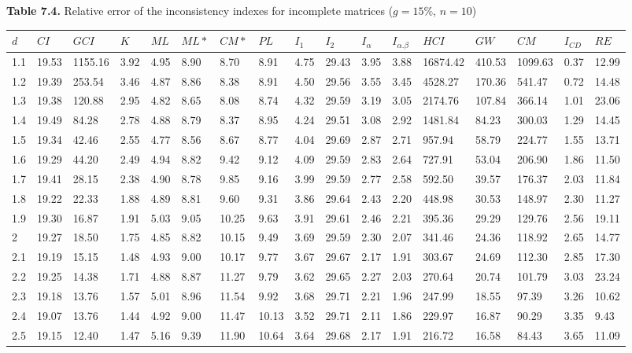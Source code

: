 \newpage
\textbf{Table 7.4.} Relative error of the inconsistency indexes for incomplete matrices ($g=15\%$, $n=10$)
\begin{adjustbox}{angle=90}
  \begin{center}
    \begin{tabular}{|l|llllllllllllllll|}
      \hline $d$ &
$CI$&$	\textit{GCI}$&$K$&$ML$&$ML*$&$CM*$&$PL$&$I_1$&$I_2$&$I_{\alpha}$&$I_{\alpha.\beta}$&$HCI$&$GW$&$CM$&$I_{CD}$&$RE$\\ \hline \hline
1.1&19.53&1155.16&3.92&4.95&8.90&8.70&8.91&4.75&29.43&3.95&3.88&16874.42&410.53&1099.63&0.37&12.99  \\ 
1.2&19.39&253.54&3.46&4.87&8.86&8.38&8.91&4.50&29.56&3.55&3.45&4528.27&170.36&541.47&0.72&14.48  \\ 
1.3&19.38&120.88&2.95&4.82&8.65&8.08&8.74&4.32&29.59&3.19&3.05&2174.76&107.84&366.14&1.01&23.06  \\ 
1.4&19.49&84.28&2.78&4.88&8.79&8.37&8.95&4.24&29.51&3.08&2.92&1481.84&84.23&300.03&1.29&14.45  \\ 
1.5&19.34&42.46&2.55&4.77&8.56&8.67&8.77&4.04&29.69&2.87&2.71&957.94&58.79&224.77&1.55&13.71  \\ 
1.6&19.29&44.20&2.49&4.94&8.82&9.42&9.12&4.09&29.59&2.83&2.64&727.91&53.04&206.90&1.86&11.50  \\ 
1.7&19.41&28.15&2.38&4.90&8.78&9.85&9.16&3.99&29.59&2.77&2.58&592.50&39.57&176.37&2.03&11.84  \\ 
1.8&19.22&22.33&1.88&4.89&8.81&9.60&9.31&3.86&29.64&2.43&2.20&448.98&30.53&148.97&2.30&11.27  \\ 
1.9&19.30&16.87&1.91&5.03&9.05&10.25&9.63&3.91&29.61&2.46&2.21&395.36&29.29&129.76&2.56&19.11  \\ 
2&19.27&18.50&1.75&4.85&8.82&10.15&9.49&3.69&29.59&2.30&2.07&341.46&24.36&118.92&2.65&14.77  \\ 
2.1&19.19&15.15&1.48&4.93&9.00&10.17&9.77&3.67&29.67&2.17&1.91&303.67&24.69&112.30&2.85&17.30  \\ 
2.2&19.25&14.38&1.71&4.88&8.87&11.27&9.79&3.62&29.65&2.27&2.03&270.64&20.74&101.79&3.03&23.24  \\ 
2.3&19.18&13.76&1.57&5.01&8.96&11.54&9.92&3.68&29.71&2.21&1.96&247.99&18.55&97.39&3.26&10.62  \\ 
2.4&19.07&13.76&1.44&4.92&9.00&11.47&10.13&3.52&29.71&2.11&1.86&229.97&16.87&90.29&3.35&9.43  \\ 
2.5&19.15&12.40&1.47&5.16&9.39&11.90&10.64&3.64&29.68&2.17&1.91&216.72&16.58&84.43&3.65&11.09  \\ 

\end{tabular}
\end{center}
\end{adjustbox}

